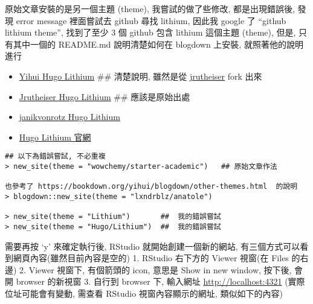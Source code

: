 \documentclass[
]{book}
\providecommand{\tightlist}{%
  \setlength{\itemsep}{0pt}\setlength{\parskip}{0pt}}
\begin{document}
原始文章安裝的是另一個主題 (theme), 我嘗試的做了些修改, 都是出現錯誤後, 發現 error message 裡面嘗試去 github 尋找 lithium, 因此我 google 了 ``github lithium theme'', 找到了至少 3 個 github 包含 lithium 這個主題 (theme), 但是, 只有其中一個的 README.md 說明清楚如何在 blogdown 上安裝, 就照著他的說明進行

\begin{itemize}
\tightlist
\item
  \href{https://github.com/yihui/hugo-lithium}{Yihui Hugo Lithium} \#\# 清楚說明, 雖然是從 \href{https://github.com/jrutheiser/hugo-lithium-theme}{jrutheiser} fork 出來
\item
  \href{https://github.com/jrutheiser/hugo-lithium-theme}{Jrutheiser Hugo Lithium} \#\# 應該是原始出處
\item
  \href{https://github.com/janikvonrotz/hugo-lithium-theme}{janikvonrotz Hugo Lithium}
\item
  \href{https://themes.gohugo.io/hugo-lithium-theme/}{Hugo Lithium 官網}
\end{itemize}

\begin{verbatim}
## 以下為錯誤嘗試, 不必重複
> new_site(theme = "wowchemy/starter-academic")   ## 原始文章作法

也參考了 https://bookdown.org/yihui/blogdown/other-themes.html  的說明
> blogdown::new_site(theme = "lxndrblz/anatole")

> new_site(theme = "Lithium")       ##  我的錯誤嘗試
> new_site(theme = "Hugo/Lithium")  ##  我的錯誤嘗試
\end{verbatim}

需要再按 `y' 來確定執行後, RStudio 就開始創建一個新的網站, 有三個方式可以看到網頁內容(雖然目前內容是空的)
1. RStudio 右下方的 Viewer 視窗(在 Files 的右邊)
2. Viewer 視窗下, 有個箭頭的 icon, 意思是 Show in new window, 按下後, 會開 browser 的新視窗
3. 自行到 browser 下, 輸入網址 \url{http://localhost:4321} (實際位址可能會有變動, 需查看 RStudio 視窗內容顯示的網址, 類似如下的內容)
\end{document}
